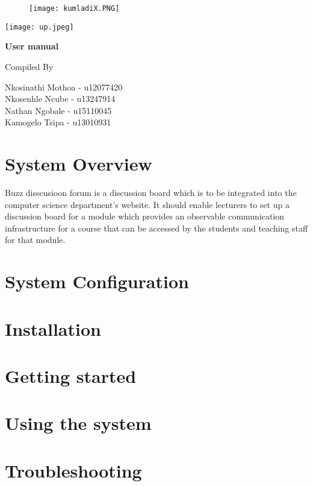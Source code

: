 \documentclass[12pt]{article}
\begin{document}
		\begin{figure}[h!]\texttt{[image: kumladiX.PNG]}
		\end{figure}
		
		\begin{center}
			\texttt{[image: up.jpeg]}
			\begin{huge}
				
				\bigskip
				\bigskip
				\bigskip
			
				\bigskip
				\bigskip
			\end{huge}
			\begin{huge}
				\textbf{User manual}
			\end{huge}
			\newpage
			\pagebreak
			
Compiled By \\[\baselineskip]
{\large
	
	Nkosinathi Mothoa - u12077420\\
	Nkosenhle Ncube - u13247914\\
	Nathan Ngobale - u15110045\\
	Kamogelo Tsipa - u13010931\\
	\par}

\end{center}

\newpage

\section{System Overview}
\par{Buzz disscusioon forum is a discussion board which is to be integrated into the computer science department’s website. It should enable lecturers to set up a discussion board for a module which provides an observable communication infrastructure for a course that can be accessed by the students and teaching staff for that module.}

\section{System Configuration}
\section{Installation}
\section{Getting started}
\section{Using the system}
\section{Troubleshooting}
\end{document}
